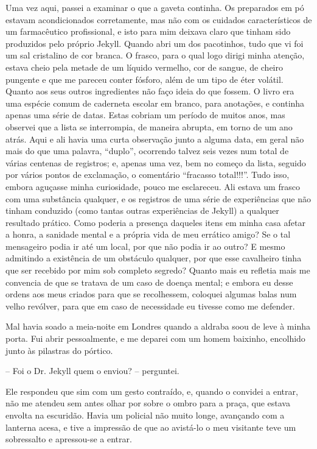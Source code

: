 Uma vez aqui, passei a examinar o que a gaveta continha.  Os preparados
em pó estavam acondicionados corretamente, mas não com os cuidados
característicos de um farmacêutico profissional, e isto para mim
deixava claro que tinham sido produzidos pelo próprio Jekyll.  Quando
abri um dos pacotinhos, tudo que vi foi um sal cristalino de cor
branca.  O frasco, para o qual logo dirigi minha atenção, estava cheio
pela metade de um líquido vermelho, cor de sangue, de cheiro pungente e
que me pareceu conter fósforo, além de um tipo de éter volátil.  Quanto
aos seus outros ingredientes não faço ideia do que fossem.  O livro era
uma espécie comum de caderneta escolar em branco, para anotações, e
continha apenas uma série de datas.  Estas cobriam um período de muitos
anos, mas observei que a lista se interrompia, de maneira abrupta, em
torno de um ano atrás.  Aqui e ali havia uma curta observação junto a
alguma data, em geral não mais do que uma palavra, “duplo”, ocorrendo
talvez seis vezes num total de várias centenas de registros; e, apenas
uma vez, bem no começo da lista, seguido por vários pontos de
exclamação, o comentário “fracasso total!!!”.  Tudo isso, embora
aguçasse minha curiosidade, pouco me esclareceu.  Ali
estava um frasco com uma substância qualquer, e os registros de uma
série de experiências que não tinham conduzido (como tantas outras
experiências de Jekyll) a qualquer resultado prático.  Como poderia a
presença daqueles itens em minha casa afetar a honra, a sanidade mental
e a própria vida de meu errático amigo?  Se o tal mensageiro podia ir
até um local, por que não podia ir ao outro?  E mesmo admitindo a
existência de um obstáculo qualquer, por que esse cavalheiro tinha que
ser recebido por mim sob completo segredo?  Quanto mais eu refletia
mais me convencia de que se tratava de um caso de doença mental; e
embora eu desse ordens aos meus criados para que se recolhessem,
coloquei algumas balas num velho revólver, para que em caso de
necessidade eu tivesse como me defender.

Mal havia soado a meia-noite em Londres quando a aldraba soou de leve à
minha porta.  Fui abrir pessoalmente, e me deparei com um homem
baixinho, encolhido junto às pilastras do pórtico.

-- Foi o Dr. Jekyll quem o enviou? -- perguntei.

Ele respondeu que sim com um gesto contraído, e, quando o convidei a
entrar, não me atendeu sem antes olhar por sobre o ombro para a praça,
que estava envolta na escuridão.  Havia um policial não muito longe,
avançando com a lanterna acesa, e tive a impressão de que ao avistá-lo
o meu visitante teve um sobressalto e apressou-se a entrar.

